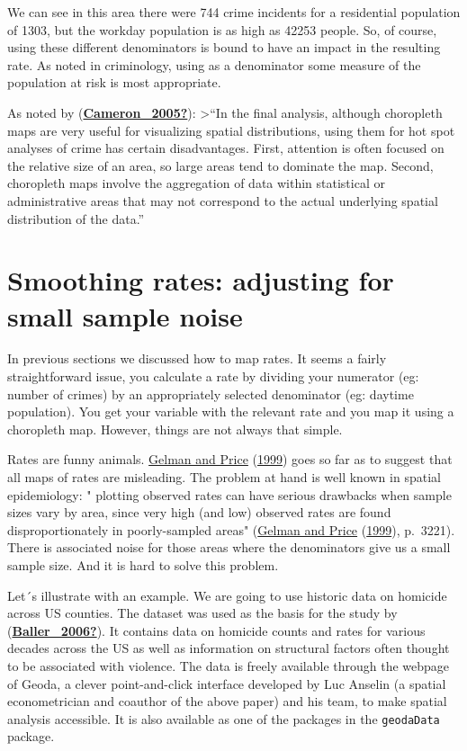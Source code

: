 \documentclass[
]{book}
\begin{document}
We can see in this area there were 744 crime incidents for a residential population of 1303, but the workday population is as high as 42253 people. So, of course, using these different denominators is bound to have an impact in the resulting rate. As noted in criminology, using as a denominator some measure of the population at risk is most appropriate.

As noted by (\protect\hyperlink{ref-Cameron_2005}{\textbf{Cameron\_2005?}}):
\textgreater{}``In the final analysis, although choropleth maps are very useful for visualizing spatial distributions, using them for hot spot analyses of crime has certain disadvantages. First, attention is often focused on the relative size of an area, so large areas tend to dominate the map. Second, choropleth maps involve the aggregation of data within statistical or administrative areas that may not correspond to the actual underlying spatial distribution of the data.''

\hypertarget{smoothing-rates-adjusting-for-small-sample-noise}{%
\section{Smoothing rates: adjusting for small sample noise}\label{smoothing-rates-adjusting-for-small-sample-noise}}

In previous sections we discussed how to map rates. It seems a fairly straightforward issue, you calculate a rate by dividing your numerator (eg: number of crimes) by an appropriately selected denominator (eg: daytime population). You get your variable with the relevant rate and you map it using a choropleth map. However, things are not always that simple.

Rates are funny animals. \protect\hyperlink{ref-Gelman_1999}{Gelman and Price} (\protect\hyperlink{ref-Gelman_1999}{1999}) goes so far as to suggest that all maps of rates are misleading. The problem at hand is well known in spatial epidemiology: " plotting observed rates can have serious drawbacks when sample sizes vary by area, since very high (and low) observed rates are found disproportionately in poorly-sampled areas" (\protect\hyperlink{ref-Gelman_1999}{Gelman and Price} (\protect\hyperlink{ref-Gelman_1999}{1999}), p.~3221). There is associated noise for those areas where the denominators give us a small sample size. And it is hard to solve this problem.

Let´s illustrate with an example. We are going to use historic data on homicide across US counties. The dataset was used as the basis for the study by (\protect\hyperlink{ref-Baller_2006}{\textbf{Baller\_2006?}}). It contains data on homicide counts and rates for various decades across the US as well as information on structural factors often thought to be associated with violence. The data is freely available through the webpage of Geoda, a clever point-and-click interface developed by Luc Anselin (a spatial econometrician and coauthor of the above paper) and his team, to make spatial analysis accessible. It is also available as one of the packages in the \texttt{geodaData} package.
\end{document}
